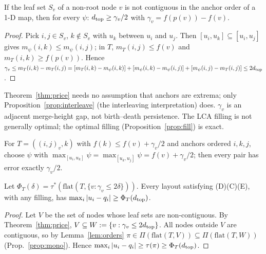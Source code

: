 \begin{theorem}\label{thm:price}
If the leaf set $S_v$ of a non-root node $v$ is not contiguous in the anchor order of a 1-D map, then for every $\psi$: $d_{\rm top}\ge\gamma_v/2$ with $\gamma_v=f(p(v))-f(v)$.
\end{theorem}
\begin{proof}Pick $i,j\in S_v$, $k\notin S_v$ with $u_k$ between $u_i$ and $u_j$. Then $[u_i,u_k]\subseteq[u_i,u_j]$ gives $m_\psi(i,k)\le m_\psi(i,j)$; in $T$, $m_T(i,j)\le f(v)$ and $m_T(i,k)\ge f(p(v))$. Hence
$\gamma_v\le m_T(i,k)-m_T(i,j)=[m_T(i,k)-m_\psi(i,k)]+[m_\psi(i,k)-m_\psi(i,j)]+[m_\psi(i,j)-m_T(i,j)]\le 2d_{\rm top}$.\end{proof}
\begin{remark}Theorem~\ref{thm:price} needs no assumption that anchors are extrema; only Proposition~\ref{prop:interleave} (the interleaving interpretation) does. $\gamma_v$ is an adjacent merge-height gap, not birth--death persistence. The LCA filling is not generally optimal; the optimal filling (Proposition~\ref{prop:fill}) is exact.\end{remark}
\begin{remark}[Tightness]For $T=((i,j)_v,k)$ with $f(k)\le f(v)+\gamma_v/2$ and anchors ordered $i,k,j$, choose $\psi$ with $\max_{[u_i,u_k]}\psi=\max_{[u_k,u_j]}\psi=f(v)+\gamma_v/2$; then every pair has error exactly $\gamma_v/2$.\end{remark}

\begin{corollary}\label{cor:frontier}Let $\Phi_T(\delta)=\tau^*(\mathrm{flat}(T,\{v:\gamma_v\le2\delta\}))$. Every layout satisfying (D)(C)(E), with any filling, has $\max_i|u_i-q_i|\ge\Phi_T(d_{\rm top})$.\end{corollary}
\begin{proof}Let $V$ be the set of nodes whose leaf sets are non-contiguous. By Theorem~\ref{thm:price}, $V\subseteq W:=\{v:\gamma_v\le 2d_{\rm top}\}$. All nodes outside $V$ are contiguous, so by Lemma~\ref{lem:orders} $\pi\in\Pi(\mathrm{flat}(T,V))\subseteq\Pi(\mathrm{flat}(T,W))$ (Prop.~\ref{prop:mono}). Hence $\max_i|u_i-q_i|\ge\tau(\pi)\ge\Phi_T(d_{\rm top})$.\end{proof}

